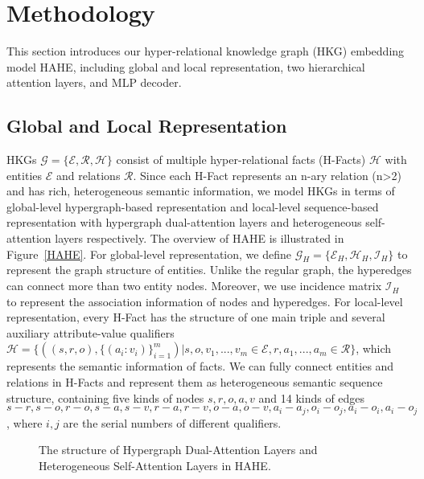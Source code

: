 \documentclass[11pt]{article}
\begin{document}
\section{Methodology}
This section introduces our hyper-relational knowledge graph (HKG) embedding model HAHE, including global and local representation, two hierarchical attention layers, and MLP decoder.

\subsection{Global and Local Representation}
HKGs $\mathcal{G}=\{\mathcal{E},\mathcal{R},\mathcal{H}\}$ consist of multiple hyper-relational facts (H-Facts) $\mathcal{H}$ with entities $\mathcal{E}$ and relations $\mathcal{R}$. Since each H-Fact represents an n-ary relation (n>2) and has rich, heterogeneous semantic information, we model HKGs in terms of global-level hypergraph-based representation and local-level sequence-based representation with hypergraph dual-attention layers and heterogeneous self-attention layers respectively. The overview of HAHE is illustrated in Figure~\ref{HAHE}. For global-level representation, we define $\mathcal{G}_H=\{\mathcal{E}_H,\mathcal{H}_H,\mathcal{I}_H\}$ to represent the graph structure of entities. Unlike the regular graph, the hyperedges can connect more than two entity nodes. Moreover, we use incidence matrix $\mathcal{I}_H$ to represent the association information of nodes and hyperedges. For local-level representation, every H-Fact has the structure of one main triple and several auxiliary attribute-value qualifiers $\mathcal{H}=\{((s,r,o),\{(a_i:v_i)\}^m_{i=1})|s,o,v_1, ...,v_m\in\mathcal{E}, r,a_1,...,a_m\in\mathcal{R}\}$, which represents the semantic information of facts. We can fully connect entities and relations in H-Facts and represent them as heterogeneous semantic sequence structure, containing five kinds of nodes $s,r,o,a,v$ and 14 kinds of edges $s-r, s-o, r-o, s-a, s-v, r-a, r-v, o-a, o-v, a_i-a_j, o_i -o_j, a_i-o_i, a_i-o_j$, where $i,j$ are the serial numbers of different qualifiers. 
 
 \begin{figure*}[h!t]
	\centering    

    \hspace{7mm}
	
	\caption{The structure of Hypergraph Dual-Attention Layers and Heterogeneous Self-Attention Layers in HAHE.} \label{fig:1}  \end{figure*}
 
\end{document}
